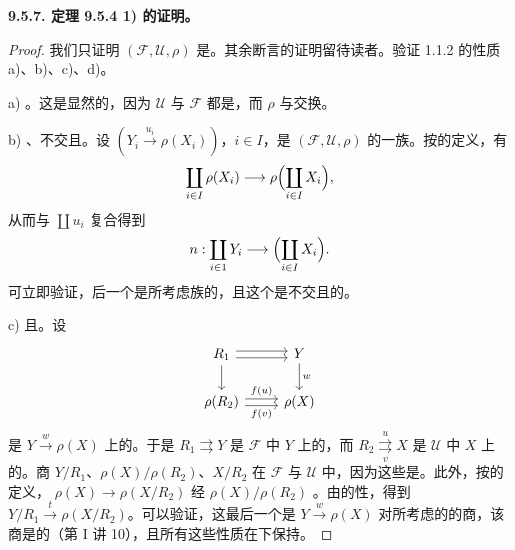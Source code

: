 \textbf{9.5.7. 定理 9.5.4 1) 的证明。}
\begin{proof}
我们只证明 $(\mathscr F,\mathscr U,\rho)$ 是。其余断言的证明留待读者。验证 1.1.2 的性质 a)、b)、c)、d)。

a) 。这是显然的，因为 $\mathscr U$ 与 $\mathscr F$ 都是，而 $\rho$ 与交换。

b) 、不交且。设 $(Y_i\xrightarrow{u_i}\rho(X_i))$，$i\in I$，是 $(\mathscr F,\mathscr U,\rho)$ 的一族。按的定义，有
\[
\coprod_{i\in I}\rho(X_i)\longrightarrow\rho\Bigl(\coprod_{i\in I}X_i\Bigr),
\]
从而与 $\coprod u_i$ 复合得到
\[
n:\coprod_{i\in 1}Y_i\longrightarrow\Bigl(\coprod_{i\in I}X_i\Bigr).
\]
可立即验证，后一个是所考虑族的，且这个是不交且的。

c) 且。设
\[
\begin{tikzcd}
R_1\arrow[r,shift left]\arrow[r,shift right]\arrow[d]&Y\arrow[d,"w"]\\
\rho(R_2)\arrow[r,shift left,"f(u)"]\arrow[r,shift right,"f(v)"']&\rho(X)
\end{tikzcd}
\]
是 $Y\xrightarrow{w}\rho(X)$ 上的。于是 $R_1\rightrightarrows Y$ 是 $\mathscr F$ 中 $Y$ 上的，而 $R_2\underset{v}{\overset{u}{\rightrightarrows}}X$ 是 $\mathscr U$ 中 $X$ 上的。商 $Y/R_1$、$\rho(X)/\rho(R_2)$、$X/R_2$ 在 $\mathscr F$ 与 $\mathscr U$ 中，因为这些是。此外，按的定义， $\rho(X)\to\rho(X/R_2)$ 经 $\rho(X)/\rho(R_2)$ 。由的性，得到
$Y/R_1\xrightarrow{t}\rho(X/R_2)$。可以验证，这最后一个是 $Y\xrightarrow{w}\rho(X)$ 对所考虑的的商，该商是的（第 I 讲 10），且所有这些性质在下保持。


\end{proof}
